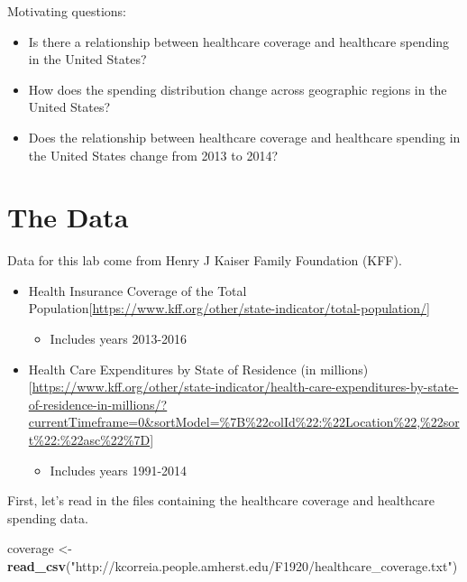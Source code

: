 \documentclass[
]{article}
\newenvironment{Shaded}{\begin{snugshade}}{\end{snugshade}}
\newcommand{\KeywordTok}[1]{\textcolor[rgb]{0.13,0.29,0.53}{\textbf{#1}}}
\newcommand{\NormalTok}[1]{#1}
\newcommand{\StringTok}[1]{\textcolor[rgb]{0.31,0.60,0.02}{#1}}
\providecommand{\tightlist}{%
  \setlength{\itemsep}{0pt}\setlength{\parskip}{0pt}}
\begin{document}
Motivating questions:

\begin{itemize}
\tightlist
\item
  Is there a relationship between healthcare coverage and healthcare
  spending in the United States?
\item
  How does the spending distribution change across geographic regions in
  the United States?
\item
  Does the relationship between healthcare coverage and healthcare
  spending in the United States change from 2013 to 2014?
\end{itemize}

\hypertarget{the-data}{%
\section{The Data}\label{the-data}}

Data for this lab come from Henry J Kaiser Family Foundation (KFF).

\begin{itemize}
\tightlist
\item
  Health Insurance Coverage of the Total
  Population{[}\url{https://www.kff.org/other/state-indicator/total-population/}{]}

  \begin{itemize}
  \tightlist
  \item
    Includes years 2013-2016
  \end{itemize}
\item
  Health Care Expenditures by State of Residence (in
  millions){[}\url{https://www.kff.org/other/state-indicator/health-care-expenditures-by-state-of-residence-in-millions/?currentTimeframe=0\&sortModel=\%7B\%22colId\%22:\%22Location\%22,\%22sort\%22:\%22asc\%22\%7D}{]}

  \begin{itemize}
  \tightlist
  \item
    Includes years 1991-2014
  \end{itemize}
\end{itemize}

First, let's read in the files containing the healthcare coverage and
healthcare spending data.

\begin{Shaded}
\begin{Highlighting}[]
\NormalTok{coverage <-}\StringTok{ }\KeywordTok{read_csv}\NormalTok{(}\StringTok{"http://kcorreia.people.amherst.edu/F1920/healthcare_coverage.txt"}\NormalTok{)}
\end{Highlighting}
\end{Shaded}
\end{document}
